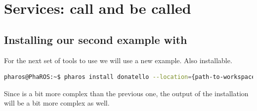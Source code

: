\documentclass[a4paper,10pt,twoside]{book}
\begin{document}
\fi
\sloppy
\chapter{ Services: call and be called}
			
		\section{Installing our second example with \installationTool{}} \label{donatello:installing}
			
			 
			For the next set of tools to use we will use a new example. Also installable. 
			
			\begin{lstlisting}[language=bash,title={Installing donatello}]
				pharos@PhaROS:~$ pharos install donatello --location={path-to-workspace}
			\end{lstlisting}
		
			
			
			Since is a bit more complex than the previous one, the output of the installation will be a bit more complex as well.
			
\end{document}
